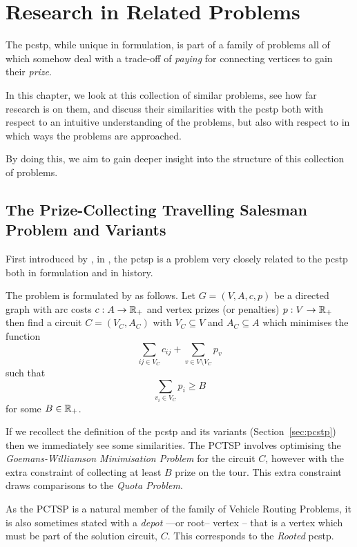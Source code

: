 \chapter{Research in Related Problems}
\label{chap:related}
The \gls{pcstp}, while unique in formulation,
is part of a family of problems all of which somehow deal with a
trade-off of \textit{paying} for connecting vertices to gain their \textit{prize}.

In this chapter, we look at this collection of similar problems,
see how far research is on them,
and discuss their similarities with the \gls{pcstp}
both with respect to an intuitive understanding of the problems,
but also with respect to in which ways the problems are approached.

By doing this, we aim to gain deeper insight into the structure of
this collection of problems.

\section{The Prize-Collecting Travelling Salesman Problem and Variants}\label{sec:rel:tsp}
First introduced by \citet*{balas1989prize}, in \citeyear{balas1989prize},
the \gls{pctsp} is a problem very closely related to the \gls{pcstp} both
in formulation and in history.

The problem is formulated by \citeauthor{balas1989prize} as follows. Let
$G = (V, A, c, p)$ be a directed
graph with arc costs $c: A \to \mathbb{R}_+$ and vertex prizes (or penalties) $p: V \to \mathbb{R}_+$
then find a circuit $C = (V_C, A_C)$ with $V_C \subseteq V$ and $A_C \subseteq A$ which
minimises the function
\[\sum_{ij \in V_C} c_{ij} + \sum_{v \in V \setminus V_C} p_v\]
such that
\[\sum_{v_i \in V_C} p_i \geq B\]
for some $B \in \mathbb{R}_+$.

If we recollect the definition of the \gls{pcstp}
and its variants (Section~\ref{sec:pcstp}) then
we immediately see some similarities. The PCTSP involves optimising the
\textit{Goemans-Williamson Minimisation Problem} for the circuit $C$,
however with the extra
constraint of collecting at least $B$ prize on the tour.
This extra constraint draws comparisons
to the \textit{Quota Problem}.

As the PCTSP is a natural member of the family of Vehicle Routing Problems, it is also sometimes
stated with a \textit{depot} ---or root--
vertex \citep{feillet2005traveling} -- that is a vertex which
must be part of the solution circuit, $C$. This corresponds to the \textit{Rooted}
\gls{pcstp}.

